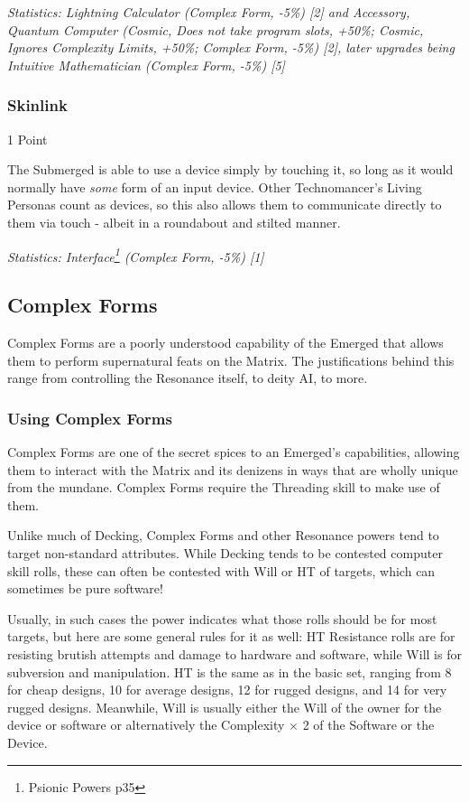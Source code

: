 \begin{multicols*}{3}
	\textit{\textcolor{OliveGreen}{Statistics: Lightning Calculator (Complex Form, -5\%) [2] and Accessory, Quantum Computer (Cosmic, Does not take program slots, +50\%; Cosmic, Ignores Complexity Limits, +50\%; Complex Form, -5\%) [2], later upgrades being Intuitive Mathematician (Complex Form, -5\%) [5] }}
		
	\subsubsection{Skinlink}
	\begin{flushright}
		1 Point
	\end{flushright}
	
	The Submerged is able to use a device simply by touching it, so long as it would normally have \textit{some} form of an input device. Other Technomancer's Living Personas count as devices, so this also allows them to communicate directly to them via touch - albeit in a roundabout and stilted manner.
	
	\textit{\textcolor{OliveGreen}{Statistics: Interface\footnote{Psionic Powers p35} (Complex Form, -5\%) [1] }}
	
	\subsection{Complex Forms}
	
	Complex Forms are a poorly understood capability of the Emerged that allows them to perform supernatural feats on the Matrix. The justifications behind this range from controlling the Resonance itself, to deity AI, to more.
	
	\subsubsection{Using Complex Forms}
	
	Complex Forms are one of the secret spices to an Emerged's capabilities, allowing them to interact with the Matrix and its denizens in ways that are wholly unique from the mundane. Complex Forms require the Threading skill to make use of them.
	
	Unlike much of Decking, Complex Forms and other Resonance powers tend to target non-standard attributes. While Decking tends to be contested computer skill rolls, these can often be contested with Will or HT of targets, which can sometimes be pure software! 
	
	Usually, in such cases the power indicates what those rolls should be for most targets, but here are some general rules for it as well: HT Resistance rolls are for resisting brutish attempts and damage to hardware and software, while Will is for subversion and manipulation. HT is the same as in the basic set, ranging from 8 for cheap designs, 10 for average designs, 12 for rugged designs, and 14 for very rugged designs. Meanwhile, Will is usually either the Will of the owner for the device or software or alternatively the Complexity $\times$ 2 of the Software or the Device.
	

\end{multicols*}
